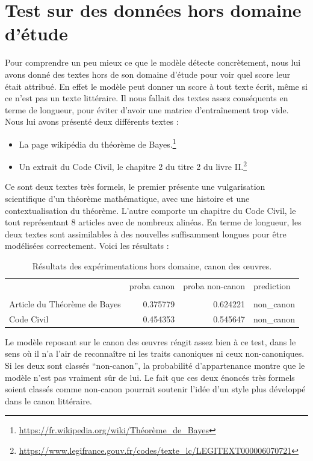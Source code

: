 \section{Test sur des données hors domaine d'étude}

Pour comprendre un peu mieux ce que le modèle détecte concrètement, nous lui avons donné des textes hors de son domaine d'étude pour voir quel score leur était attribué. En effet le modèle peut donner un score à tout texte écrit, même si ce n'est pas un texte littéraire. Il nous fallait des textes assez conséquents en terme de longueur, pour éviter d'avoir une matrice d'entraînement trop vide. Nous lui avons présenté deux différents textes : 

\begin{itemize}
    \item La page wikipédia du théorème de Bayes.\footnote{\url{https://fr.wikipedia.org/wiki/Théorème_de_Bayes}}
    \item Un extrait du Code Civil, le chapitre 2 du titre 2 du livre II.\footnote{\url{https://www.legifrance.gouv.fr/codes/texte_lc/LEGITEXT000006070721}}
\end{itemize}

Ce sont deux textes très formels, le premier présente une vulgarisation scientifique d'un théorème mathématique, avec une histoire et une contextualisation du théorème. L'autre comporte un chapitre du Code Civil, le tout représentant 8 articles avec de nombreux alinéas. En terme de longueur, les deux textes sont assimilables à des nouvelles suffisamment longues pour être modélisées correctement. Voici les résultats :
\bigskip

\begin{table}[ht]
    \centering
    \begin{tabular}{lrrl}
    \toprule
    {} &  proba canon &  proba non-canon & prediction \\
                     &              &                  &            \\
    \midrule
    Article du Théorème de Bayes  &         0.375779 &         0.624221 &  non\_canon \\
    Code Civil                &         0.454353 &         0.545647 &  non\_canon \\
    \bottomrule
    \end{tabular}
    \caption{Résultats des expérimentations hors domaine, canon des œuvres.}
\end{table}

Le modèle reposant sur le canon des œuvres réagit assez bien à ce test, dans le sens où il n'a l'air de reconnaître ni les traits canoniques ni ceux non-canoniques. Si les deux sont classés \enquote{non-canon}, la probabilité d'appartenance montre que le modèle n'est pas vraiment sûr de lui. Le fait que ces deux énoncés très formels soient classés comme non-canon pourrait soutenir l'idée d'un style plus développé dans le canon littéraire. 


